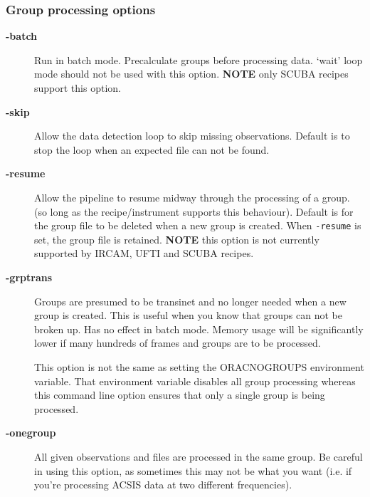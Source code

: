 \documentclass[twoside,11pt]{article}
\renewcommand{\_}{\texttt{\symbol{95}}}
\begin{document}
\subsubsection*{Group processing options\label{oracdr_Group_processing_options}}
\begin{description}

\item[{\textbf{-batch}}] \mbox{}

Run in batch mode. Precalculate groups before processing
data. `wait' loop mode should not be used with this option.
\textbf{NOTE} only SCUBA recipes support this option.


\item[{\textbf{-skip}}] \mbox{}

Allow the data detection loop to skip missing observations.
Default is to stop the loop when an expected file can not be found.


\item[{\textbf{-resume}}] \mbox{}

Allow the pipeline to resume midway through the processing
of a group. (so long as the recipe/instrument supports
this behaviour). Default is for the group file to be deleted
when a new group is created. When \texttt{-resume} is set, the group
file is retained. \textbf{NOTE} this option is not currently supported by
IRCAM, UFTI and SCUBA recipes.


\item[{\textbf{-grptrans}}] \mbox{}

Groups are presumed to be transinet and no longer needed when a new
group is created.  This is useful when you know that groups can not be
broken up. Has no effect in batch mode. Memory usage will be
significantly lower if many hundreds of frames and groups are to be
processed.



This option is not the same as setting the ORAC\_NOGROUPS environment
variable. That environment variable disables all group processing
whereas this command line option ensures that only a single group
is being processed.


\item[{\textbf{-onegroup}}] \mbox{}

All given observations and files are processed in the same group. Be
careful in using this option, as sometimes this may not be what you
want (i.e. if you're processing ACSIS data at two different
frequencies).

\end{description}
\end{document}
